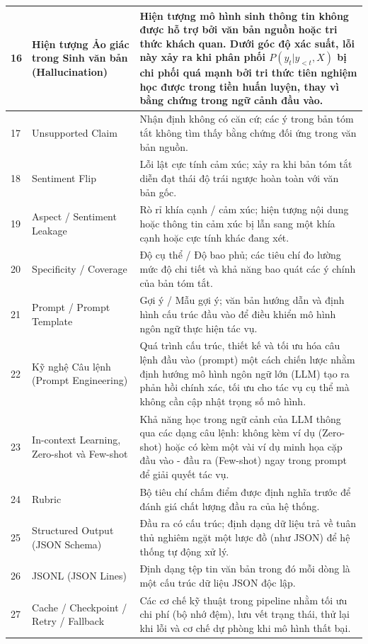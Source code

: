 \documentclass[12pt,a4paper]{report}
\begin{document}
\begin{longtable}{|p{}|p{}|p{}|}
16 & Hiện tượng Ảo giác trong Sinh văn bản (Hallucination) & Hiện tượng mô hình sinh thông tin không được hỗ trợ bởi văn bản nguồn hoặc tri thức khách quan. Dưới góc độ xác suất, lỗi này xảy ra khi phân phối $P(y_t|y_{<t}, X)$ bị chi phối quá mạnh bởi tri thức tiên nghiệm học được trong tiền huấn luyện, thay vì bằng chứng trong ngữ cảnh đầu vào. \\ \hline
17 & Unsupported Claim & Nhận định không có căn cứ; các ý trong bản tóm tắt không tìm thấy bằng chứng đối ứng trong văn bản nguồn. \\ \hline
18 & Sentiment Flip & Lỗi lật cực tính cảm xúc; xảy ra khi bản tóm tắt diễn đạt thái độ trái ngược hoàn toàn với văn bản gốc. \\ \hline
19 & Aspect / Sentiment Leakage & Rò rỉ khía cạnh / cảm xúc; hiện tượng nội dung hoặc thông tin cảm xúc bị lẫn sang một khía cạnh hoặc cực tính khác đang xét. \\ \hline
20 & Specificity / Coverage & Độ cụ thể / Độ bao phủ; các tiêu chí đo lường mức độ chi tiết và khả năng bao quát các ý chính của bản tóm tắt. \\ \hline
21 & Prompt / Prompt Template & Gợi ý / Mẫu gợi ý; văn bản hướng dẫn và định hình cấu trúc đầu vào để điều khiển mô hình ngôn ngữ thực hiện tác vụ. \\ \hline
22 & Kỹ nghệ Câu lệnh (Prompt Engineering) & Quá trình cấu trúc, thiết kế và tối ưu hóa câu lệnh đầu vào (prompt) một cách chiến lược nhằm định hướng mô hình ngôn ngữ lớn (LLM) tạo ra phản hồi chính xác, tối ưu cho tác vụ cụ thể mà không cần cập nhật trọng số mô hình. \\ \hline
23 & In-context Learning, Zero-shot và Few-shot & Khả năng học trong ngữ cảnh của LLM thông qua các dạng câu lệnh: không kèm ví dụ (Zero-shot) hoặc có kèm một vài ví dụ minh họa cặp đầu vào - đầu ra (Few-shot) ngay trong prompt để giải quyết tác vụ. \\ \hline
24 & Rubric & Bộ tiêu chí chấm điểm được định nghĩa trước để đánh giá chất lượng đầu ra của hệ thống. \\ \hline
25 & Structured Output (JSON Schema) & Đầu ra có cấu trúc; định dạng dữ liệu trả về tuân thủ nghiêm ngặt một lược đồ (như JSON) để hệ thống tự động xử lý. \\ \hline
26 & JSONL (JSON Lines) & Định dạng tệp tin văn bản trong đó mỗi dòng là một cấu trúc dữ liệu JSON độc lập. \\ \hline
27 & Cache / Checkpoint / Retry / Fallback & Các cơ chế kỹ thuật trong pipeline nhằm tối ưu chi phí (bộ nhớ đệm), lưu vết trạng thái, thử lại khi lỗi và cơ chế dự phòng khi mô hình thất bại. \\ \hline

\end{longtable}
\end{document}
